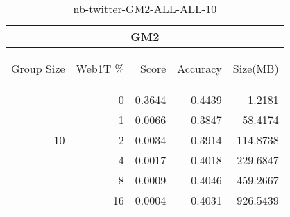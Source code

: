 \begin{center}
\begin{table}[htbp]
\begin{tabular}{ | r | r | r | r | r |}
\hline
\multicolumn{5}{|c|}{GM2}\\
\hline
\begin{sideways}Group Size\end{sideways} & \begin{sideways}Web1T \%\end{sideways} & \begin{sideways}Score\end{sideways} & \begin{sideways}Accuracy\end{sideways} & \begin{sideways}Size(MB)\end{sideways}\\
\hline
\multirow{5}{*}{10}
 & 0 & 0.3644 & 0.4439 & 1.2181\\ \cline{2-5}
 & 1 & 0.0066 & 0.3847 & 58.4174\\ \cline{2-5}
 & 2 & 0.0034 & 0.3914 & 114.8738\\ \cline{2-5}
 & 4 & 0.0017 & 0.4018 & 229.6847\\ \cline{2-5}
 & 8 & 0.0009 & 0.4046 & 459.2667\\ \cline{2-5}
 & 16 & 0.0004 & 0.4031 & 926.5439\\ \cline{2-5}
\hline
\end{tabular}
\caption{nb-twitter-GM2-ALL-ALL-10}
\label{table:nb-twitter-GM2-ALL-ALL-10}
\end{table}
\end{center}

